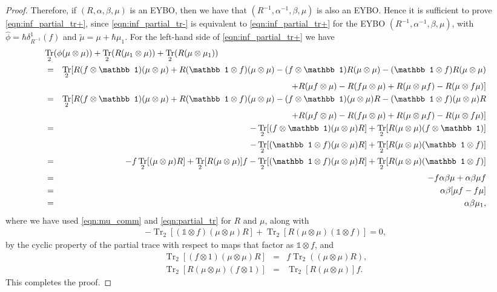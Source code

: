 \documentclass[11pt,fleqn]{amsart} %
\DeclareMathOperator{\tr}{Tr}
\begin{document}
\begin{proof}
		Therefore,  if $(R,\alpha, \beta,\mu)$ is an EYBO, then  we have that $(R^{-1},\alpha^{-1},\beta,\mu)$ is also an EYBO. 
		Hence it is sufficient to prove \eqref{eqn:inf_partial_tr+}, 
		since \eqref{eqn:inf_partial_tr-} is equivalent to \eqref{eqn:inf_partial_tr+} for the EYBO $(R^{-1},\alpha^{-1},\beta,\mu)$, with  $\hat \phi =  \hbar \delta^1_{ R^{-1}}(f)$ 
		and $\tilde \mu= \mu +\hbar\mu_1$.		
		For the left-hand side of \eqref{eqn:inf_partial_tr+} we have 
		\begin{eqnarray*}
				\lefteqn{\tr_2(\phi(\mu\otimes \mu)) + \tr_2(R(\mu_1\otimes \mu)) + \tr_2(R(\mu\otimes \mu_1))}\\ 
				&=& \tr_2[R(f\otimes \mathbb 1)(\mu\otimes \mu) + R(\mathbb 1\otimes f)(\mu\otimes \mu)
				 - (f\otimes \mathbb 1)R(\mu\otimes \mu) - (\mathbb 1\otimes f)R(\mu\otimes \mu)\\
				 && \hspace{1cm} + R(\mu f\otimes \mu) - R(f\mu \otimes \mu) + R(\mu\otimes \mu f) - R(\mu\otimes f\mu)]\\
				 &=& \tr_2[R(f\otimes \mathbb 1)(\mu\otimes \mu) + R(\mathbb 1\otimes f)(\mu\otimes \mu)
				 - (f\otimes \mathbb 1)(\mu\otimes \mu)R - (\mathbb 1\otimes f)(\mu\otimes \mu)R\\
				 && \hspace{1cm} + R(\mu f\otimes \mu) - R(f\mu \otimes \mu) + R(\mu\otimes \mu f) - R(\mu\otimes f\mu)]\\
				 &=& -\tr_2[(f\otimes \mathbb 1)(\mu\otimes \mu)R] 
				 + \tr_2[R(\mu\otimes \mu)(f\otimes \mathbb 1)]\\
				 && - \tr_2[(\mathbb 1\otimes f)(\mu\otimes \mu)R] 
				 + \tr_2[R(\mu\otimes \mu)(\mathbb 1\otimes f)]\\
				 &=& -f\tr_2[(\mu\otimes \mu)R] 
					 + \tr_2[R(\mu\otimes \mu)]f - \tr_2[(\mathbb 1\otimes f)(\mu\otimes \mu)R] 
			+ \tr_2[R(\mu\otimes \mu)(\mathbb 1\otimes f)]\\
				&=& -f\alpha\beta \mu
				+ \alpha\beta\mu f\\
				 &=& \alpha\beta[\mu f-f\mu]\\
				 &=& \alpha\beta\mu_1,   
		\end{eqnarray*}
		where we have used \eqref{eqn:mu_comm} and \eqref{eqn:partial_tr} for $R$ and $\mu$, 
		along with 
		\begin{eqnarray*}
				- \tr_2[(\mathbb 1\otimes f)(\mu\otimes \mu)R] + \tr_2[R(\mu\otimes \mu)(\mathbb 1\otimes f)]=0,
		\end{eqnarray*}
		 by the cyclic property of the partial trace with respect to maps that factor as $\mathbb 1\otimes f$, and 
		 \begin{eqnarray*}
		 		\tr_2[(f\otimes 1)(\mu\otimes \mu)R] &=& f\tr_2((\mu\otimes \mu)R), \\
		 		\tr_2[R(\mu\otimes \mu)(f\otimes 1)] &=& \tr_2[R(\mu\otimes \mu)]f.
		 \end{eqnarray*}
		 This completes the proof. 
	\end{proof}
\end{document}

